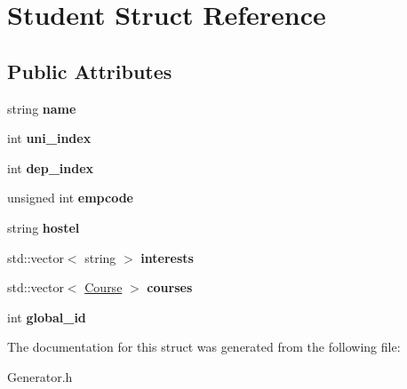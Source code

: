 \hypertarget{struct_student}{\section{Student Struct Reference}
\label{struct_student}
}
\subsection*{Public Attributes}
\begin{DoxyCompactItemize}
\item 
\hypertarget{struct_student_a671f6b115a158653a0f0bece34ea0667}{string {\bfseries name}}\label{struct_student_a671f6b115a158653a0f0bece34ea0667}

\item 
\hypertarget{struct_student_a375562292968268a3b82b0bc5a5df0c9}{int {\bfseries uni\-\_\-index}}\label{struct_student_a375562292968268a3b82b0bc5a5df0c9}

\item 
\hypertarget{struct_student_a4778a16bde68e89ebdd105ccdd5f67d6}{int {\bfseries dep\-\_\-index}}\label{struct_student_a4778a16bde68e89ebdd105ccdd5f67d6}

\item 
\hypertarget{struct_student_abb799f8dab5ad37dc5bd6949d4b2f48a}{unsigned int {\bfseries empcode}}\label{struct_student_abb799f8dab5ad37dc5bd6949d4b2f48a}

\item 
\hypertarget{struct_student_ae3e8403d18e0755b3d299080e9351276}{string {\bfseries hostel}}\label{struct_student_ae3e8403d18e0755b3d299080e9351276}

\item 
\hypertarget{struct_student_afe044e42f79a811c92487a48249fdb87}{std\-::vector$<$ string $>$ {\bfseries interests}}\label{struct_student_afe044e42f79a811c92487a48249fdb87}

\item 
\hypertarget{struct_student_a9aec712e202c7896a63a39c9320b1af0}{std\-::vector$<$ \hyperlink{struct_course}{Course} $>$ {\bfseries courses}}\label{struct_student_a9aec712e202c7896a63a39c9320b1af0}

\item 
\hypertarget{struct_student_af80a124a6d0157bb63b6345859fa6f83}{int {\bfseries global\-\_\-id}}\label{struct_student_af80a124a6d0157bb63b6345859fa6f83}

\end{DoxyCompactItemize}


The documentation for this struct was generated from the following file\-:\begin{DoxyCompactItemize}
\item 
Generator.\-h\end{DoxyCompactItemize}
